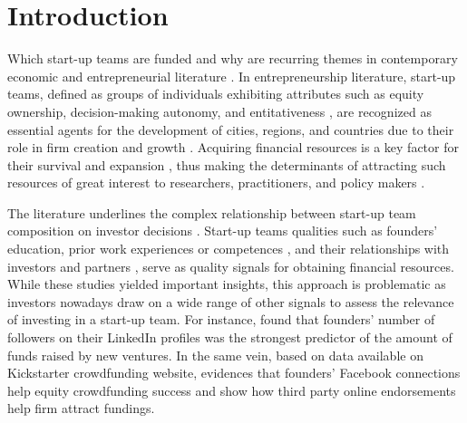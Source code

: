 \documentclass[12pt]{article}
\begin{document}
\clearpage
\section{Introduction}

Which start-up teams are funded and why are recurring themes in contemporary economic and entrepreneurial literature \citep{baum2004picking, beckman2007early, bernstein2017attracting, franke2006you, franke2008venture, kaplan2009should, plummer2016better, shane2002network}. In entrepreneurship literature, start-up teams, defined as groups of individuals exhibiting attributes such as equity ownership, decision-making autonomy, and entitativeness \citep{knight2020start}, are recognized as essential agents for the development of cities, regions, and countries due to their role in firm creation and growth \citep{audretsch2001linking, autio2016entrepreneurship}. Acquiring financial resources is a key factor for their survival and expansion \citep{rosenbusch2013does}, thus making the determinants of attracting such resources of great interest to researchers, practitioners, and policy makers \citep{EUcommission2015digital}.

The literature underlines the complex relationship between start-up team composition on investor decisions \citep{ghassemiautomated, klotz2014new}. Start-up teams qualities such as founders' education, prior work experiences or competences \citep{errico2023source, shane2002network, hsu2007experienced}, and their relationships with investors and partners \citep{huang2017resources}, serve as quality signals for obtaining financial resources. While these studies yielded important insights, this approach is problematic as investors nowadays draw on a wide range of other signals to assess the relevance of investing in a start-up team. For instance, \citet{banerji2019startup} found that founders' number of followers on their LinkedIn profiles was the strongest predictor of the amount of funds raised by new ventures. In the same vein, based on data available on Kickstarter crowdfunding website, \citet{mollick2014dynamics} evidences that founders' Facebook connections help equity crowdfunding success and \citet{courtney2017resolving} show how third party online endorsements help firm attract fundings.
\end{document}
